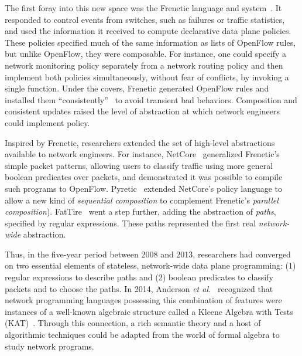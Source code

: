 \documentclass[10pt]{sigalternate052015}
\begin{document}
The first foray into this new space was the Frenetic language and system~\cite{frenetic}.  It responded to control
events from switches, such as failures or traffic statistics, and used
the information it received to compute declarative data plane
policies.  These policies specified much of the same information as
lists of OpenFlow rules, but unlike OpenFlow, they were composable.  For
instance, one could specify a network monitoring policy separately
from a network routing policy and then implement both policies
simultaneously, without fear of conflicts, by invoking a single
function.  Under the covers, Frenetic 
generated OpenFlow rules and installed them
``consistently''~\cite{consistent-updates} to avoid transient bad
behaviors.  Composition and consistent updates
raised the level of abstraction at which
network engineers could implement policy.

Inspired by Frenetic, researchers extended the set of
high-level abstractions available to network engineers.  For instance,
NetCore~\cite{netcore} generalized Frenetic's
simple packet patterns, allowing users to classify traffic
using more general boolean predicates over packets, and demonstrated
it was possible to compile
such programs to OpenFlow.
Pyretic~\cite{pyretic} extended NetCore's policy language to allow a
new kind of \emph{sequential composition} to complement Frenetic's
\emph{parallel composition}).  FatTire~\cite{fattire} went a step
further, adding the
abstraction of \emph{paths}, specified by regular expressions.
These paths represented the first real \emph{network-wide}
abstraction.

Thus, in the five-year period between 2008 and 2013,
researchers had converged on two essential elements of stateless,
network-wide data
plane programming:  (1) regular expressions to describe paths and (2)
boolean predicates to classify packets and to choose the paths.  In 2014, Anderson \emph{et al.}~\cite{netkat}
recognized that network programming languages possessing this
combination of features were instances of a well-known algebraic
structure called a Kleene Algebra with Tests
(KAT)~\cite{kat}.  Through this connection, a rich semantic
theory and a host of algorithmic techniques could be adapted from the
world of formal algebra to study network programs.
\end{document}

